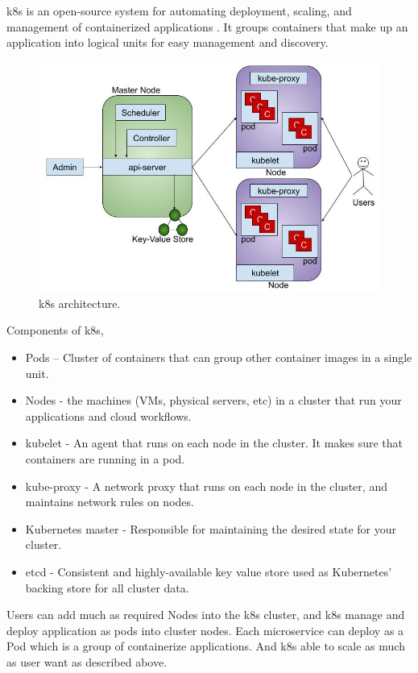 \acrfull{k8s} is an open-source system for automating deployment, scaling, and management of containerized applications \cite{LinuxFoundationProduction-GradeKubernetes}. It groups containers that make up an application into logical units for easy management and discovery.
\begin{figure}[htp]
    \centering
    \includegraphics[width=1\textwidth]{method/microservice/k8s_architecture_v3.jpg}
    \caption{\acrfull{k8s} architecture.}
    \label{fi:k8s_architecture}
\end{figure}
Components of \acrshort{k8s},
\begin{itemize}
    \item Pods – Cluster of containers that can group other container images in a single unit.
    \item Nodes - the machines (VMs, physical servers, etc) in a cluster that run your applications and cloud workflows.
    \item kubelet - An agent that runs on each node in the cluster. It makes sure that containers are running in a pod.
    \item kube-proxy - A network proxy that runs on each node in the cluster, and maintains network rules on nodes.
    \item Kubernetes master - Responsible for maintaining the desired state for your cluster.
    \item etcd - Consistent and highly-available key value store used as Kubernetes’ backing store for all cluster data.
\end{itemize}
Users can add much as required Nodes into the \acrshort{k8s} cluster, and \acrshort{k8s} manage and deploy application as pods into cluster nodes.
Each microservice can deploy as a Pod which is a group of containerize applications. And \acrshort{k8s} able to scale as much as user want as described above.


